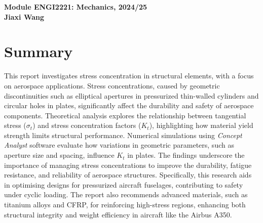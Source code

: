 \documentclass[a4paper,11pt]{article}
\newcommand{\customtitle}{
    \begin{center}
        \textbf{\LARGE {Module ENGI2221: Mechanics, 2024/25}} \\[0.5cm]
        \textbf{\Large Jiaxi Wang}
    \end{center}
}
\begin{document}
\customtitle

 
{\small
\tableofcontents
}


\listoffigures %
 \vspace{-10pt}
\vspace{-10pt}
\section*{Summary}
\vspace{-10pt}
This report investigates stress concentration in structural elements, with a focus on aerospace applications. Stress concentrations, caused by geometric discontinuities such as elliptical apertures in pressurized thin-walled cylinders and circular holes in plates, significantly affect the durability and safety of aerospace components. Theoretical analysis explores the relationship between tangential stress ($\sigma_t$) and stress concentration factors ($K_t$), highlighting how material yield strength limits structural performance. Numerical simulations using \textit{Concept Analyst} software \cite{conceptanalyst2024} evaluate how variations in geometric parameters, such as aperture size and spacing, influence $K_t$ in plates. The findings underscore the importance of managing stress concentrations to improve the durability, fatigue resistance, and reliability of aerospace structures. Specifically, this research aids in optimising designs for pressurized aircraft fuselages, contributing to safety under cyclic loading. The report also recommends advanced materials, such as titanium alloys and CFRP, for reinforcing high-stress regions, enhancing both structural integrity and weight efficiency in aircraft like the Airbus A350.
\vspace{-15pt}
\end{document}

